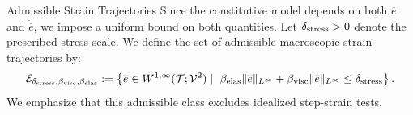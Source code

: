 \documentclass[3p, 12pt, preprint]{elsarticle}
\begin{document}
\begin{namedparagraph}{Admissible Strain Trajectories}
    Since the constitutive model depends on both $\overline e$ and $\dot{\overline e}$, we impose a uniform bound on both quantities. Let $\delta_{\rm stress}>0$ denote the prescribed stress scale. We define the set of admissible macroscopic strain trajectories by:
    \begin{equation}\label{eq:admissible_strain}
        \mathcal{E}_{\delta_{\rm stress}, \beta_{\rm visc},\beta_{\rm elas}} := \left\{ \overline{e} \in W^{1, \infty}(\mathcal{T}; \mathcal{V}^2) \mid \ \beta_{\rm elas}\|\overline{e}\|_{L^{\infty}} + \beta_{\rm visc}\|\dot{\overline{e}}\|_{L^{\infty}} \leq\delta_{\rm stress} \right\}.
    \end{equation}
We emphasize that this admissible class excludes idealized step-strain tests.
\end{namedparagraph}
\end{document}
